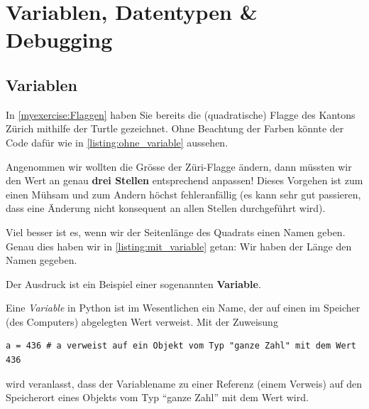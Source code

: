 \chapter{Variablen, Datentypen \& Debugging}\label{ch:K01Variables}

\section{Variablen}
\begin{myexample}\label{myexample:ersteVariable}
In \cref{myexercise:Flaggen} haben Sie bereits die (quadratische) Flagge des Kantons Zürich mithilfe der Turtle gezeichnet. Ohne Beachtung der Farben könnte der Code dafür wie in \cref{listing:ohne_variable} aussehen.



Angenommen wir wollten die Grösse der Züri-Flagge ändern, dann müssten wir den Wert  an genau \textbf{drei Stellen} entsprechend anpassen! Dieses Vorgehen ist zum einen Mühsam und zum Andern höchst fehleranfällig (es kann sehr gut passieren, dass eine Änderung nicht konsequent an allen Stellen durchgeführt wird).

Viel besser ist es, wenn wir der Seitenlänge des Quadrats einen Namen geben. Genau dies haben wir in \cref{listing:mit_variable} getan: Wir haben der Länge den Namen  gegeben.

Der Ausdruck  ist ein Beispiel einer sogenannten \textbf{Variable}.
\end{myexample}

\begin{mydefinition}
Eine \textit{Variable} in Python ist im Wesentlichen ein Name, der auf einen im Speicher (des Computers) abgelegten Wert verweist. Mit der Zuweisung
\begin{lstlisting}[numbers=none]
        a = 436 # a verweist auf ein Objekt vom Typ "ganze Zahl" mit dem Wert 436
    \end{lstlisting}
wird veranlasst, dass der Variablename  zu einer Referenz (einem Verweis) auf den Speicherort eines Objekts vom Typ \enquote{ganze Zahl} mit dem Wert  wird.
\end{mydefinition}

